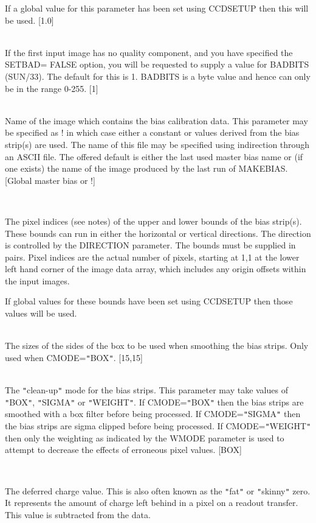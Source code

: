 \documentclass[twoside,11pt]{article}
\newcommand{\htmlref}[2]{#1}
\renewcommand{\_}{\texttt{\symbol{95}}}
\newcommand{\qt}[1]{{\tt "}#1{\tt "}}
\newcommand{\xroutine}[1]{\htmlref{{\sc #1}}{#1}}
\newcommand{\sstsubsection}[1]{ \item[{#1}] \mbox{} \\}
\newcommand{\sstsubsection}[1]{\item[{#1}]}
\begin{document}
{{{         If a global value for this parameter has been set using
         \xroutine{CCDSETUP} then this will be used.
         [1.0]
      }
      \sstsubsection{
         BADBITS = \_INTEGER (Read)
      } {
         If the first input image has no quality component, and you have
         specified the SETBAD= FALSE option, you will be requested to
         supply a value for BADBITS (SUN/33).  The default for this
         is 1. BADBITS is a byte value and hence can only be in the
         range 0-255.
         [1]
      }
      \sstsubsection{
         BIAS = LITERAL (Read)
      } {
         Name of the image which contains the bias calibration data. This
         parameter may be specified as ! in which case either a
         constant or values derived from the bias strip(s) are used.
         The name of this file may be specified using indirection
         through an ASCII file. The offered default is either the last
         used master bias name or (if one exists) the name of the image
         produced by the last run of \xroutine{MAKEBIAS}.
         [Global master bias or !]
      }
      \sstsubsection{
         BOUNDS( 2 or 4 ) = \_INTEGER (Read)
      } {
         The pixel indices (see notes) of the upper and lower bounds of
         the bias strip(s). These bounds can run in either the
         horizontal or vertical directions. The direction is controlled
         by the DIRECTION parameter. The bounds must be supplied in
         pairs. Pixel indices are the actual number of pixels, starting
         at 1,1 at the lower left hand corner of the image data array,
         which includes any origin offsets within the input images.

         If global values for these bounds have been set using
         \xroutine{CCDSETUP} then those values will be used.
      }
      \sstsubsection{
         BOXSIZE( 2 ) = \_INTEGER (Read)
      } {
         The sizes of the sides of the box to be used when smoothing the
         bias strips. Only used when CMODE=\qt{BOX}.
         [15,15]
      }
      \sstsubsection{
         CMODE = LITERAL (Read)
      } {
         The \qt{clean-up} mode for the bias strips. This parameter may
         take values of \qt{BOX}, \qt{SIGMA} or \qt{WEIGHT}.
         If CMODE=\qt{BOX} then
         the bias strips are smoothed with a box filter before being
         processed. If CMODE=\qt{SIGMA} then the bias strips are sigma
         clipped before being processed. If CMODE=\qt{WEIGHT} then only
         the weighting as indicated by the WMODE parameter is used to
         attempt to decrease the effects of erroneous pixel values.
         [BOX]
      }
      \sstsubsection{
         DEFERRED = \_DOUBLE (Read)
      } {
         The deferred charge value. This is also often known as the
         \qt{fat} or \qt{skinny} zero. It represents the amount of charge
         left behind in a pixel on a readout transfer. This value is
         subtracted from the data.

}}}
\end{document}
